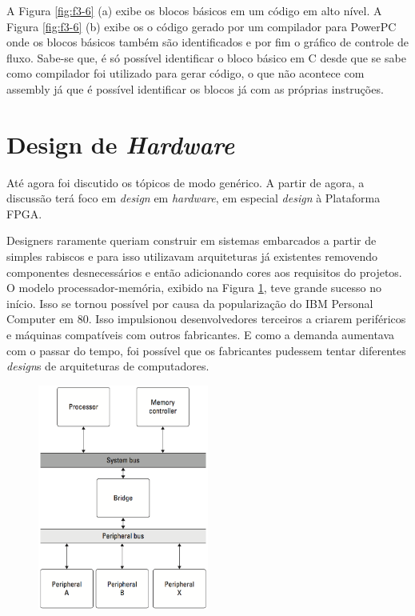 A Figura \ref{fig:f3-6} (a) exibe os blocos básicos em um código em alto nível. A Figura \ref{fig:f3-6} (b) exibe os o código gerado por um compilador para PowerPC onde os blocos básicos também são identificados e por fim o gráfico de controle de fluxo. Sabe-se que, é só possível identificar o bloco básico em C desde que se sabe como compilador foi  utilizado para gerar código, o que não acontece com assembly já que é possível identificar os blocos já com as próprias instruções.


\section{Design de \textit{Hardware}}

Até agora foi discutido os tópicos de modo genérico. A partir de agora, a discussão terá foco em \textit{design} em \textit{hardware}, em especial \textit{design} à Plataforma FPGA.

Designers raramente queriam construir em sistemas embarcados a partir de simples rabiscos e para isso utilizavam arquiteturas já existentes removendo componentes desnecessários e então adicionando cores aos requisitos do projetos. O modelo processador-memória, exibido na Figura \ref{fig:f3-8}, teve grande sucesso no início. Isso se tornou possível por causa da popularização do IBM Personal Computer em 80. Isso impulsionou desenvolvedores terceiros a criarem periféricos e máquinas compatíveis com outros fabricantes. E como a demanda aumentava com o passar do tempo, foi possível que os fabricantes pudessem tentar diferentes \textit{design}s de arquiteturas de computadores.

\begin{figure}[h] \centering
	\includegraphics[width=0.5\textwidth]{img/f3-8.png}
	\caption{}
	\label{fig:f3-8}
\end{figure}

